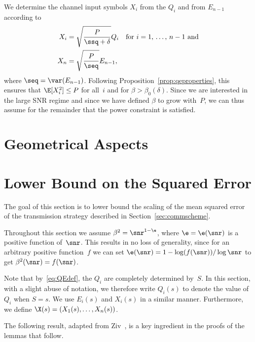 We determine the channel input symbols $X_i$ from the $Q_i$ and from $E_{n-1}$
according to 
\begin{align}
  X_i &= \sqrt{\frac{P}{\ssq + \delta}} Q_i \quad
  \text{for $i = 1$, \dots, $n-1$ and} \nonumber\\
  X_n &= \sqrt{\frac{P}{\seq}} E_{n-1},
  \label{eq:Xdef}
\end{align}
where $\seq = \var(E_{n-1})$.  Following Proposition~\ref{prop:qeproperties},
this ensures that $\E[X_i^2] \le P$ for all~$i$ and for $\beta >
\beta_0(\delta)$.  Since we are interested in the large SNR regime and since we
have defined $\beta$ to grow with~$P$, we can thus assume for the remainder that
the power constraint is satisfied. 


\section{Geometrical Aspects}

\section{Lower Bound on the Squared Error}

The goal of this section is to lower bound the scaling of the mean squared error
of the transmission strategy described in Section~\ref{sec:commscheme}.

Throughout this section we assume $\beta^2 = \snr^{1-\e}$, where $\e = \e(\snr)$
is a positive function of~$\snr$. This results in no loss of generality, since
for an arbitrary positive function~$f$ we can set $\e(\snr) =
1-\log(f(\snr))/\log\snr$ to get $\beta^2(\snr) = f(\snr)$.

Note that by~\eqref{eq:QEdef}, the $Q_i$ are completely determined by~$S$.
In this section, with a slight abuse of notation, we therefore write $Q_i(s)$ to
denote the value of~$Q_i$ when $S = s$. We use $E_i(s)$ and $X_i(s)$ in a
similar manner. Furthermore, we define $\X(s) = (X_1(s), \dots, X_n(s))$.

The following result, adapted from Ziv~\cite{Ziv1970}, is a key ingredient in
the proofs of the lemmas that follow.

